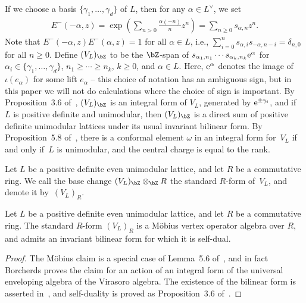 If we choose a basis $\{ \gamma_1,\ldots,\gamma_d\}$ of $L$, then for any $\alpha \in L^\vee$, we set
\begin{gather*} E^-(-\alpha,z) = \exp \left( \sum_{n > 0} \frac{\alpha(-n)}{n}z^n \right) = \sum_{n \geq 0} s_{\alpha, n} z^n. \end{gather*}
Note that $E^-(-\alpha,z)E^-(\alpha,z) = 1$ for all $\alpha \in L$, i.e., $\sum\limits_{i=0}^n s_{\alpha,i} s_{-\alpha,n-i} = \delta_{n,0}$ for all $n \geq 0$. Define $(V_L)_{\bZ}$ to be the $\bZ$-span of $s_{\alpha_1,n_1} \cdots s_{\alpha_k,n_k} {\rm e}^\alpha$ for $\alpha_i \in \{ \gamma_1,\ldots,\gamma_d\}$, $n_1 \geq \cdots \geq n_k$, $k \geq 0$, and $\alpha \in L$. Here, ${\rm e}^\alpha$ denotes the image of $\iota(e_\alpha)$ for some lift $e_\alpha$ -- this choice of notation has an ambiguous sign, but in this paper we will not do calculations where the choice of sign is important. By Proposition~3.6 of~\cite{DG12}, $(V_L)_{\bZ}$ is an integral form of $V_L$, generated by ${\rm e}^{\pm\gamma_i}$, and if~$L$ is positive definite and unimodular, then $(V_L)_{\bZ}$ is a direct sum of positive definite unimodular lattices under its usual invariant bilinear form. By Proposition~5.8 of~\cite{M14}, there is a conformal element $\omega$ in an integral form for~$V_L$ if and only if~$L$ is unimodular, and the central charge is equal to the rank.

\begin{defn}Let $L$ be a positive definite even unimodular lattice, and let $R$ be a commutative ring. We call the base change $(V_L)_{\bZ} \otimes_{\bZ} R$ the standard $R$-form of~$V_L$, and denote it by~$(V_L)_R$.
\end{defn}

\begin{lem} \label{lem:standard-R-form}Let $L$ be a positive definite even unimodular lattice, and let $R$ be a commutative ring. The standard $R$-form $(V_L)_R$ is a M\"obius vertex operator algebra over $R$, and admits an invariant bilinear form for which it is self-dual.
\end{lem}
\begin{proof}The M\"obius claim is a special case of Lemma~5.6 of~\cite{B99}, and in fact Borcherds proves the claim for an action of an integral form of the universal enveloping algebra of the Virasoro algebra. The existence of the bilinear form is asserted in~\cite{B86}, and self-duality is proved as Proposition~3.6 of~\cite{DG12}.
\end{proof}

